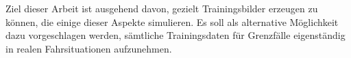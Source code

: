 Ziel dieser Arbeit ist ausgehend davon, gezielt Trainingsbilder erzeugen zu können, die einige dieser Aspekte simulieren. Es soll als alternative Möglichkeit dazu vorgeschlagen werden, sämtliche Trainingsdaten für Grenzfälle eigenständig in realen Fahrsituationen aufzunehmen.

